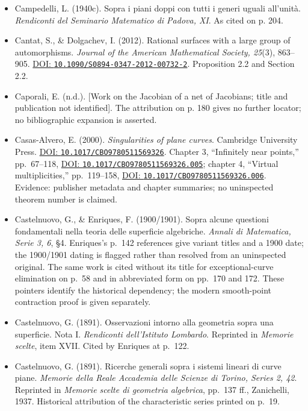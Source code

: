 \begin{sloppypar}
\begin{itemize}
\item Campedelli, L. (1940c). Sopra i piani doppi con tutti i generi uguali all'unit\`a. \emph{Rendiconti del Seminario Matematico di Padova, XI}. As cited on p. 204.

\item Cantat, S., \& Dolgachev, I. (2012). Rational surfaces with a large group of automorphisms. \emph{Journal of the American Mathematical Society, 25}(3), 863--905. \href{https://doi.org/10.1090/S0894-0347-2012-00732-2}{DOI: \nolinkurl{10.1090/S0894-0347-2012-00732-2}}. Proposition 2.2 and Section 2.2.

\item Caporali, E. (n.d.). [Work on the Jacobian of a net of Jacobians; title and publication not identified]. The attribution on p. 180 gives no further locator; no bibliographic expansion is asserted.

\item Casas-Alvero, E. (2000). \emph{Singularities of plane curves}. Cambridge University Press. \href{https://doi.org/10.1017/CBO9780511569326}{DOI: \nolinkurl{10.1017/CBO9780511569326}}. Chapter 3, ``Infinitely near points,'' pp.~67--118, \href{https://doi.org/10.1017/CBO9780511569326.005}{DOI: \nolinkurl{10.1017/CBO9780511569326.005}}; chapter 4, ``Virtual multiplicities,'' pp.~119--158, \href{https://doi.org/10.1017/CBO9780511569326.006}{DOI: \nolinkurl{10.1017/CBO9780511569326.006}}. Evidence: publisher metadata and chapter summaries; no uninspected theorem number is claimed.

\item Castelnuovo, G., \& Enriques, F. (1900/1901). Sopra alcune questioni fondamentali nella teoria delle superficie algebriche. \emph{Annali di Matematica, Serie 3, 6}, §4. Enriques's p.~142 references give variant titles and a 1900 date; the 1900/1901 dating is flagged rather than resolved from an uninspected original. The same work is cited without its title for exceptional-curve elimination on p.~58 and in abbreviated form on pp.~170 and 172. These pointers identify the historical dependency; the modern smooth-point contraction proof is given separately.

\item Castelnuovo, G. (1891). Osservazioni intorno alla geometria sopra una superficie. Nota I. \emph{Rendiconti dell'Istituto Lombardo}. Reprinted in \emph{Memorie scelte}, item XVII. Cited by Enriques at p.~122.

\item Castelnuovo, G. (1891). Ricerche generali sopra i sistemi lineari di curve piane. \emph{Memorie della Reale Accademia delle Scienze di Torino, Series 2, 42}. Reprinted in \emph{Memorie scelte di geometria algebrica}, pp.~137 ff., Zanichelli, 1937. Historical attribution of the characteristic series printed on p.~19.


\end{itemize}
\end{sloppypar}
